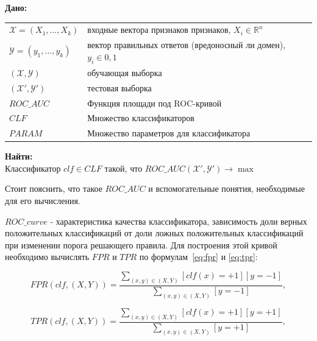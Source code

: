 \documentclass[a4paper,14pt]{extreport} %
\begin{document}
{\bf
	Дано:
}

\begin{tabular}{p{6cm} p{7.5cm}}
	$\mathcal{X}=(X_1,\ldots,X_k)$ & входные вектора признаков признаков, $X_i\in\mathbb{R}^n$                \\[0.1cm]
	$\mathcal{Y}=(y_1,\ldots,y_k)$ & вектор правильных ответов (вредоносный ли домен), $y_i\in{0,1}$ \\[0.1cm]
	$(\mathcal{X},\mathcal{Y})$    & обучающая выборка                                                                        \\[0.1cm]
	$(\mathcal{X'},\mathcal{Y'})$  & тестовая выборка                                                                          \\[0.1cm]
	$ROC\_AUC$                     & Функция площади под ROC-кривой                                                    \\[0.1cm]
	$CLF$                          & Множество классификаторов                                                        \\[0.1cm]
	$PARAM$                        & Множество параметров для классификатора                              \\[0.1cm]
		
\end{tabular}
	 
{\bf
	Найти:
	} \\

Классификатор $clf \in CLF$ такой, что $ROC\_AUC(\mathcal{X'},\mathcal{Y'}) \rightarrow \max$ 
\newline
	
Стоит пояснить, что такое $ROC\_AUC$ и вспомогательные понятия, необходимые для его вычисления. 
	
$ROC\_curve$ - характеристика качества классификатора, зависимость доли верных положительных классификаций от доли ложных положительных классификаций при изменении порога решающего правила. Для построения этой кривой необходимо вычислять $FPR$ и $TPR$ по формулам~\eqref{eq:fpr} и \eqref{eq:tpr}:
	
\begin{equation}
\label{eq:fpr}
FPR(clf, (X, Y)) = \frac{\sum_{(x, y) \in (X, Y)}[clf(x)=+1][y=-1]}{\sum_{(x, y) \in (X, Y)}[y=-1]},
\end{equation}
	
\begin{equation}
\label{eq:tpr}
TPR(clf, (X, Y)) = \frac{\sum_{(x, y) \in (X, Y)}[clf(x)=+1][y=+1]}{\sum_{(x, y) \in (X, Y)}[y=+1]},
\end{equation}
	
\end{document}

